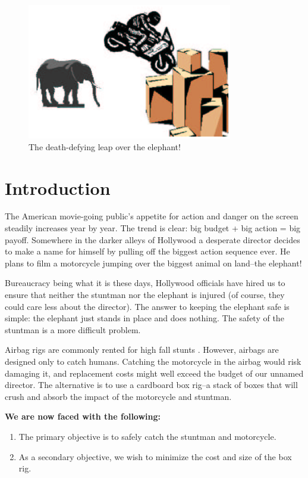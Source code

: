 \documentclass[12pt,a4paper,titlepage]{article}
\begin{document}
\tableofcontents
\newpage


\newpage

\begin{figure}
\centering
 \caption{\label{stunt} The death-defying leap over the
elephant!}
\includegraphics[width=0.8\textwidth]{whee.eps}
\end{figure}

\section{Introduction}

The American movie-going public's appetite for action and danger on the screen steadily
increases year by year.  The trend is clear: big budget + big action = big payoff.  Somewhere
in the darker alleys of Hollywood a desperate director decides to make a name for himself by
pulling off the biggest action sequence ever.  He plans to film a motorcycle jumping over the biggest
animal on land--the elephant!

Bureaucracy being what it is these days, Hollywood officials have hired us to ensure that neither
the stuntman nor the elephant is injured (of course, they could care less about the director).
The answer to keeping the elephant safe is simple: the elephant just stands in place and does nothing.
The safety of the stuntman is a more difficult problem.

Airbag rigs are commonly rented for high fall stunts \cite{MM}.  However, airbags
are designed only to catch humans.  Catching the motorcycle in the airbag would risk damaging it,
and replacement costs might well exceed the budget of our unnamed director.  The alternative
is to use a cardboard box rig--a stack of boxes that will crush and absorb the impact of the
motorcycle and stuntman.

{\bf We are now faced with the following:}
\begin{enumerate}
\item The primary objective is to safely catch the stuntman and motorcycle.
\item As a secondary objective, we wish to minimize the cost and size of the box rig.
\end{enumerate}
\end{document}
